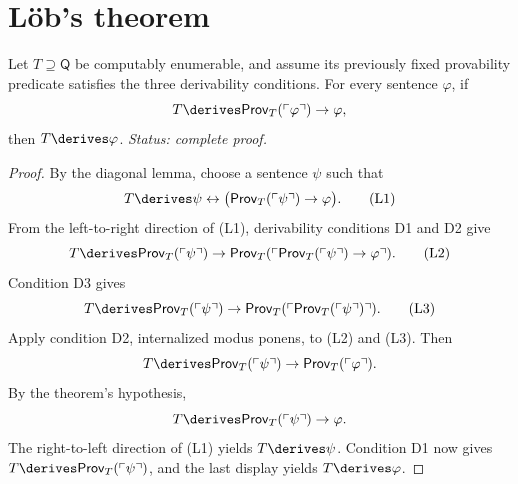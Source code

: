\section{L\"ob's theorem}
\label{sec:second-incompleteness-02}

\begin{theorem}[L\"ob]
\label{thm:lob}
Let \(T\supseteq\mathsf Q\) be computably enumerable, and assume its previously
fixed provability predicate satisfies the three derivability conditions.  For
every sentence
\(\varphi\), if
\[
  T\derives
  \mathsf{Prov}_T(\ulcorner\varphi\urcorner)\to\varphi,
\]
then \(T\derives\varphi\).
\textit{Status: complete proof.}
\end{theorem}

\begin{proof}
By the diagonal lemma, choose a sentence \(\psi\) such that
\[
  T\derives
  \psi\leftrightarrow
  \bigl(\mathsf{Prov}_T(\ulcorner\psi\urcorner)\to\varphi\bigr).
  \tag{L1}
\]
From the left-to-right direction of (L1), derivability conditions D1 and D2
give
\[
  T\derives
  \mathsf{Prov}_T(\ulcorner\psi\urcorner)
  \to
  \mathsf{Prov}_T
  (\ulcorner\mathsf{Prov}_T(\ulcorner\psi\urcorner)\to\varphi\urcorner).
  \tag{L2}
\]
Condition D3 gives
\[
  T\derives
  \mathsf{Prov}_T(\ulcorner\psi\urcorner)
  \to
  \mathsf{Prov}_T
  (\ulcorner\mathsf{Prov}_T(\ulcorner\psi\urcorner)\urcorner).
  \tag{L3}
\]
Apply condition D2, internalized modus ponens, to (L2) and (L3).  Then
\[
  T\derives
  \mathsf{Prov}_T(\ulcorner\psi\urcorner)
  \to\mathsf{Prov}_T(\ulcorner\varphi\urcorner).
\]
By the theorem's hypothesis,
\[
  T\derives
  \mathsf{Prov}_T(\ulcorner\psi\urcorner)\to\varphi.
\]
The right-to-left direction of (L1) yields \(T\derives\psi\).  Condition D1
now gives \(T\derives\mathsf{Prov}_T(\ulcorner\psi\urcorner)\), and the last
display yields \(T\derives\varphi\).
\end{proof}

